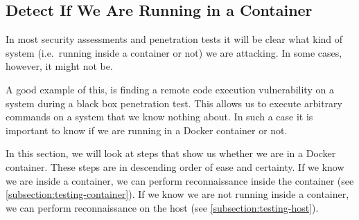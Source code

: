 \subsection{Detect If We Are Running in a Container}\label{subsection:detection}
In most security assessments and penetration tests it will be clear what kind of system (i.e.\ running inside a container or not) we are attacking. In some cases, however, it might not be.

A good example of this, is finding a remote code execution vulnerability on a system during a black box penetration test. This allows us to execute arbitrary commands on a system that we know nothing about. In such a case it is important to know if we are running in a Docker container or not.

\medskip

In this section, we will look at steps that show us whether we are in a Docker container. These steps are in descending order of ease and certainty. If we know we are inside a container, we can perform reconnaissance inside the container (see \autoref{subsection:testing-container}). If we know we are not running inside a container, we can perform reconnaissance on the host (see \autoref{subsection:testing-host}).





